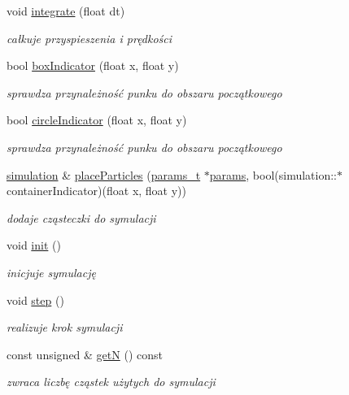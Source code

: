 \begin{DoxyCompactItemize}
void \hyperlink{classsimulation_a2b1ca39aee7b85ac2babecfd2784c459}{integrate} (float dt)
\begin{DoxyCompactList}\small\item\em całkuje przyspieszenia i prędkości \end{DoxyCompactList}\item 
bool \hyperlink{classsimulation_acd02ace3dc0db98c4c85cba7d75fa46e}{box\+Indicator} (float x, float y)
\begin{DoxyCompactList}\small\item\em sprawdza przynależność punku do obszaru początkowego \end{DoxyCompactList}\item 
bool \hyperlink{classsimulation_a3c90f4d96f7cfbafc0ef8caf4927ae2d}{circle\+Indicator} (float x, float y)
\begin{DoxyCompactList}\small\item\em sprawdza przynależność punku do obszaru początkowego \end{DoxyCompactList}\item 
\hyperlink{classsimulation}{simulation} \& \hyperlink{classsimulation_a33ce66b2291920bd1ba29889ff7c0c75}{place\+Particles} (\hyperlink{structparams__t}{params\+\_\+t} $\ast$\hyperlink{classsimulation_a861b82cc3c0e7e58abfba464a133dae3}{params}, bool(simulation\+::$\ast$container\+Indicator)(float x, float y))
\begin{DoxyCompactList}\small\item\em dodaje cząsteczki do symulacji \end{DoxyCompactList}\item 
void \hyperlink{classsimulation_a2e12616e089dd7f9742c25933bf630ef}{init} ()
\begin{DoxyCompactList}\small\item\em inicjuje symulację \end{DoxyCompactList}\item 
void \hyperlink{classsimulation_a111e26e535d53ced834dbd52948b5d69}{step} ()
\begin{DoxyCompactList}\small\item\em realizuje krok symulacji \end{DoxyCompactList}\item 
const unsigned \& \hyperlink{classsimulation_abe09252527aa58fbec8144063be3e950}{get\+N} () const 
\begin{DoxyCompactList}\small\item\em zwraca liczbę cząstek użytych do symulacji \end{DoxyCompactList}\end{DoxyCompactItemize}
